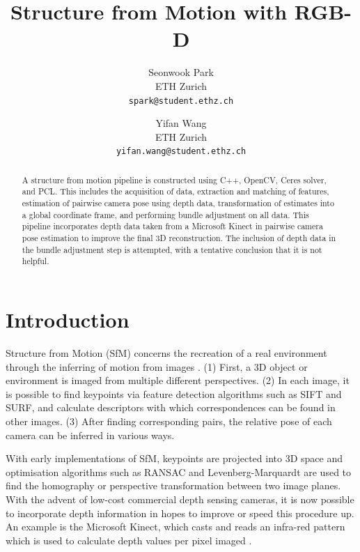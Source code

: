 \documentclass[10pt,twocolumn,letterpaper]{article}
\begin{document}
\title{Structure from Motion with RGB-D}

\author{Seonwook Park \\
ETH Zurich \\
{\tt\small spark@student.ethz.ch}
\and
Yifan Wang \\
ETH Zurich \\
{\tt\small yifan.wang@student.ethz.ch}
}

\maketitle

\begin{abstract}
   A structure from motion pipeline is constructed using C++, OpenCV, Ceres
   solver, and PCL. This includes the acquisition of data, extraction and
   matching of features, estimation of pairwise camera pose using depth data,
   transformation of estimates into a global coordinate frame, and performing
   bundle adjustment on all data. This pipeline incorporates depth data taken
   from a Microsoft Kinect in pairwise camera pose estimation to improve the
   final 3D reconstruction. The inclusion of depth data in the bundle adjustment
   step is attempted, with a tentative conclusion that it is not helpful.
\end{abstract}

\section{Introduction}

Structure from Motion (SfM) concerns the recreation of a real environment
through the inferring of motion from images \cite{varga2008practical}. (1)
First, a 3D object or environment is imaged from multiple different
perspectives. (2) In each image, it is possible to find keypoints via feature
detection algorithms such as SIFT and SURF, and calculate descriptors with which
correspondences can be found in other images. (3) After finding corresponding
pairs, the relative pose of each camera can be inferred in various ways.

With early implementations of SfM, keypoints are projected into 3D space and
optimisation algorithms such as RANSAC and Levenberg-Marquardt are used to find
the homography or perspective transformation between two image planes. With the
advent of low-cost commercial depth sensing cameras, it is now possible to
incorporate depth information in hopes to improve or speed this procedure up. An
example is the Microsoft Kinect, which casts and reads an infra-red pattern
which is used to calculate depth values per pixel imaged \cite{zhang2012microsoft}.
\end{document}
